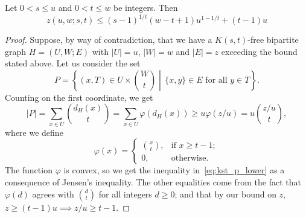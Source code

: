 \begin{theorem} \label{thm:kst}
    Let $0 < s \leq u$ and $0 < t \leq w$ be integers.
    Then
    \[z(u, w; s, t) \leq (s - 1)^{1 / t}(w - t + 1)u^{1 - 1 / t} + (t - 1)u\]
    \begin{proof}
        Suppose, by way of contradiction, that we have a $K(s, t)$-free bipartite graph $H = (U, W; E)$
        with $|U| = u$, $|W| = w$ and $|E| = z$ exceeding the bound stated above.
        Let us consider the set
        \[
            P = \left\{ (x, T) \in U \times \binom{W}{t}
            \middle\vert\, \{x, y\} \in E \text{ for all } y \in T \right\}.
        \]
        Counting on the first coordinate, we get
        \begin{equation} \label{eq:kst_p_lower}
            |P| =
            \sum_{x \in U} \binom{d_H(x)}{t} =
            \sum_{x \in U} \varphi(d_H(x)) \geq
            u \varphi(z/u) =
            u \binom{z / u}{t},
        \end{equation}
        where we define
        \[
            \varphi(x) =
            \begin{cases}
                \binom{x}{t}, & \text{if } x \geq t - 1; \\
                0, & \text{otherwise.}
            \end{cases}
        \]
        The function $\varphi$ is convex, so we get the inequality in~\eqref{eq:kst_p_lower}
        as a consequence of Jensen's inequality.
        The other equalities come from the fact that $\varphi(d)$ agrees
        with $\binom{d}{t}$ for all integers $d \geq 0$;
        and that by our bound on $z$, $z \geq (t-1)u \implies z/u \geq t - 1$.


\end{proof}
\end{theorem}

